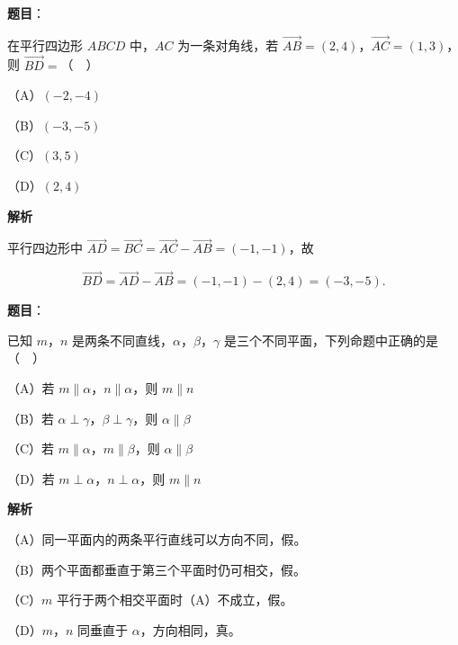 \begin{answer}

\textbf{题目}：

在平行四边形 $ABCD$ 中，$AC$ 为一条对角线，若 $\overrightarrow{AB}=(2,4)$，$\overrightarrow{AC}=(1,3)$，则 $\overrightarrow{BD}=$（　）

（A）$(-2,-4)$

（B）$(-3,-5)$

（C）$(3,5)$

（D）$(2,4)$

\textbf{解析}

平行四边形中 $\overrightarrow{AD}=\overrightarrow{BC}=\overrightarrow{AC}-\overrightarrow{AB}=(-1,-1)$，故

\nopagebreak[4]
\[\overrightarrow{BD}=\overrightarrow{AD}-\overrightarrow{AB}=(-1,-1)-(2,4)=(-3,-5).\]


\end{answer}
\begin{answer}

\textbf{题目}：

已知 $m$，$n$ 是两条不同直线，$\alpha$，$\beta$，$\gamma$ 是三个不同平面，下列命题中正确的是（　）

（A）若 $m\parallel\alpha$，$n\parallel\alpha$，则 $m\parallel n$

（B）若 $\alpha\perp\gamma$，$\beta\perp\gamma$，则 $\alpha\parallel\beta$

（C）若 $m\parallel\alpha$，$m\parallel\beta$，则 $\alpha\parallel\beta$

（D）若 $m\perp\alpha$，$n\perp\alpha$，则 $m\parallel n$

\textbf{解析}

（A）同一平面内的两条平行直线可以方向不同，假。

（B）两个平面都垂直于第三个平面时仍可相交，假。

（C）$m$ 平行于两个相交平面时（A）不成立，假。

（D）$m$，$n$ 同垂直于 $\alpha$，方向相同，真。


\end{answer}
